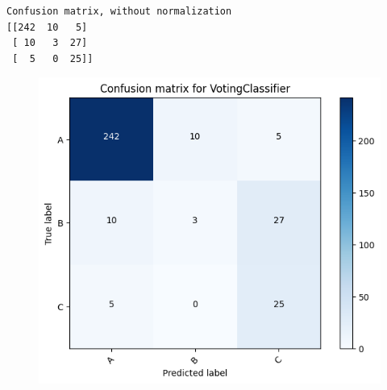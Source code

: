 \documentclass[
  letterpaper,
  DIV=11,
  numbers=noendperiod]{scrartcl}
\begin{document}
\begin{verbatim}
Confusion matrix, without normalization
[[242  10   5]
 [ 10   3  27]
 [  5   0  25]]
\end{verbatim}

\begin{figure}[H]

{\centering \includegraphics{transformer-paper4_files/figure-pdf/cell-14-output-2.png}

}

\end{figure}
\end{document}
